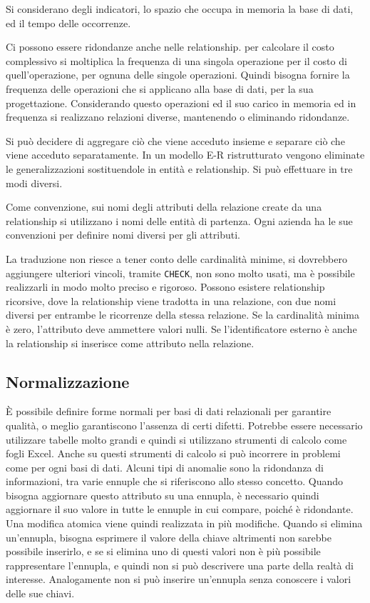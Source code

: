 \documentclass{article}
\numberwithin{equation}{subsection}
\begin{document}
Si considerano degli indicatori, lo spazio che occupa in memoria la base di dati, ed il tempo delle occorrenze. %

Ci possono essere ridondanze anche nelle relationship. %
per calcolare il costo complessivo si moltiplica la frequenza di una singola operazione per il costo di quell'operazione, per ognuna delle singole operazioni. Quindi 
bisogna fornire la frequenza delle operazioni che si applicano alla base di dati, per la sua progettazione. Considerando questo operazioni ed il suo 
carico in memoria ed in frequenza si realizzano relazioni diverse, mantenendo o eliminando ridondanze. 

Si può decidere di aggregare ciò che viene acceduto insieme e separare ciò che viene acceduto separatamente. In un modello E-R ristrutturato vengono eliminate le 
generalizzazioni sostituendole in entità e relationship. Si può effettuare in tre modi diversi. %


Come convenzione, sui nomi degli attributi della relazione create da una relationship si utilizzano i nomi delle entità di partenza. Ogni azienda ha le sue convenzioni 
per definire nomi diversi per gli attributi. 

La traduzione non riesce a tener conto delle cardinalità minime, si dovrebbero aggiungere ulteriori vincoli, tramite \verb|CHECK|, non sono molto usati, ma è possibile 
realizzarli in modo molto preciso e rigoroso. Possono esistere relationship ricorsive, dove la relationship viene tradotta in una relazione, con due nomi diversi per 
entrambe le ricorrenze della stessa relazione. 
Se la cardinalità minima è zero, l'attributo deve ammettere valori nulli. 
Se l'identificatore esterno è anche la relationship si inserisce come attributo nella relazione. 

\subsection{Normalizzazione}

\`{E} possibile definire forme normali per basi di dati relazionali per garantire qualità, o meglio garantiscono l'assenza di certi difetti. 
Potrebbe essere necessario utilizzare tabelle molto grandi e quindi si utilizzano strumenti di calcolo come fogli Excel. Anche su questi strumenti di calcolo si può 
incorrere in problemi come per ogni basi di dati. 
Alcuni tipi di anomalie sono la ridondanza di informazioni, tra varie ennuple che si riferiscono allo stesso concetto. 
Quando bisogna aggiornare questo attributo su una ennupla, è necessario quindi aggiornare il suo valore in tutte le ennuple in cui compare, poiché è ridondante. Una modifica 
atomica viene quindi realizzata in più modifiche. Quando si elimina un'ennupla, bisogna esprimere il valore della chiave altrimenti non sarebbe possibile inserirlo, e 
se si elimina uno di questi valori non è più possibile rappresentare l'ennupla, e quindi non si può descrivere una parte della realtà di interesse. Analogamente non si 
può inserire un'ennupla senza conoscere i valori delle sue chiavi. 
\end{document}
